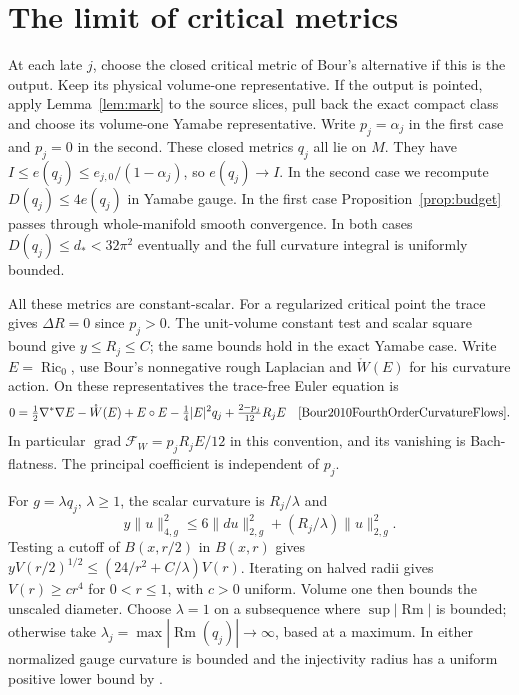 \documentclass[11pt,letterpaper]{article}
\DeclareMathOperator{\Ric}{Ric}
\DeclareMathOperator{\Rm}{Rm}
\newcommand{\F}{\mathcal F}
\begin{document}
\section{The limit of critical metrics}
At each late \(j\), choose the closed critical metric of Bour's
alternative if this is the output. Keep its physical volume-one
representative. If the output is pointed, apply Lemma~\ref{lem:mark}
to the source slices, pull back the exact compact class and choose
its volume-one Yamabe representative. Write \(p_j=\alpha_j\) in
the first case and \(p_j=0\) in the second. These closed metrics
\(q_j\) all lie on \(M\). They have \(I\le e(q_j)\le e_{j,0}/(1-\alpha_j)\),
so \(e(q_j)\to I\). In the second case we recompute \(D(q_j)\le4e(q_j)\)
in Yamabe gauge. In the first case Proposition~\ref{prop:budget}
passes through whole-manifold smooth convergence. In both cases
\(D(q_j)\le d_*<32\pi^2\) eventually and the full curvature integral
is uniformly bounded.

All these metrics are constant-scalar. For a regularized critical
point the trace gives \(\Delta R=0\) since \(p_j>0\).
The unit-volume constant test and scalar square bound give
\(y\le R_j\le C\); the same bounds hold in the exact Yamabe case.
Write \(E=\Ric_0\), use Bour's nonnegative rough Laplacian and
\(\mathring W(E)\) for his curvature action. On these representatives
the trace-free Euler equation is
\[
 0=\tfrac12\nabla^*\nabla E-\mathring W(E)
       +E\circ E-\tfrac14|E|^2q_j+\tfrac{2-p_j}{12}R_j E
 \quad\text{\cite[Proposition 4.4]{Bour2010FourthOrderCurvatureFlows}.}
\]
In particular \(\operatorname{grad}\F_W=p_j R_j E/12\) in this
convention, and its vanishing is Bach-flatness. The principal
coefficient is independent of \(p_j\).

For \(g=\lambda q_j\), \(\lambda\ge1\), the scalar curvature is
\(R_j/\lambda\) and
\[
 y\|u\|_{4,g}^2\le6\|du\|_{2,g}^2+(R_j/\lambda)\|u\|_{2,g}^2 .
\]
Testing a cutoff of \(B(x,r/2)\) in \(B(x,r)\) gives
\(y V(r/2)^{1/2}\le(24/r^2+C/\lambda)V(r)\).
Iterating on halved radii gives \(V(r)\ge c r^4\) for \(0<r\le1\),
with \(c>0\) uniform. Volume one then bounds the unscaled diameter.
Choose \(\lambda=1\) on a subsequence where \(\sup|\Rm|\) is bounded;
otherwise take \(\lambda_j=\max|\Rm(q_j)|\to\infty\), based at a
maximum. In either normalized gauge curvature is bounded and the
injectivity radius has a uniform positive lower bound by
\cite[Theorem 4.7]{CheegerGromovTaylor1982}.
\end{document}
